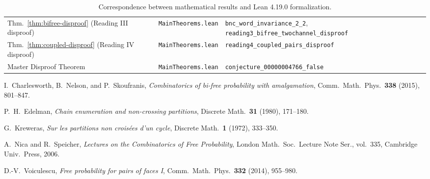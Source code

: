 \documentclass[11pt]{article}
\theoremstyle{plain}
\theoremstyle{definition}
\begin{document}
\begin{table}[ht]
\begin{tabular}{@{}>{\raggedright\arraybackslash}p{}>{\raggedright\arraybackslash}p{}>{\raggedright\arraybackslash}p{}@{}}
Thm.~\ref{thm:bifree-disproof} (Reading III disproof) & \texttt{MainTheorems.lean} & \texttt{bnc\_word\_invariance\_2\_2}, \texttt{reading3\_bifree\_twochannel\_disproof} \\
Thm.~\ref{thm:coupled-disproof} (Reading IV disproof) & \texttt{MainTheorems.lean} & \texttt{reading4\_coupled\_pairs\_disproof} \\
Master Disproof Theorem & \texttt{MainTheorems.lean} & \texttt{conjecture\_00000004766\_false} \\
\bottomrule
\end{tabular}
\caption{Correspondence between mathematical results and Lean 4.19.0 formalization.}
\label{tab:lean-map}
\end{table}

\begin{thebibliography}{9}
I.~Charlesworth, B.~Nelson, and P.~Skoufranis, \emph{Combinatorics of bi-free probability with amalgamation}, Comm.\ Math.\ Phys.\ \textbf{338} (2015), 801--847.

P.~H.~Edelman, \emph{Chain enumeration and non-crossing partitions}, Discrete Math.\ \textbf{31} (1980), 171--180.

G.~Kreweras, \emph{Sur les partitions non crois\'ees d'un cycle}, Discrete Math.\ \textbf{1} (1972), 333--350.

A.~Nica and R.~Speicher, \emph{Lectures on the Combinatorics of Free Probability}, London Math.\ Soc.\ Lecture Note Ser., vol.~335, Cambridge Univ.\ Press, 2006.

D.-V.~Voiculescu, \emph{Free probability for pairs of faces I}, Comm.\ Math.\ Phys.\ \textbf{332} (2014), 955--980.
\end{thebibliography}
\end{document}
